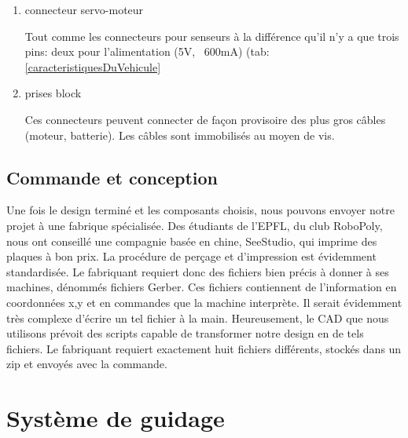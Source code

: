 \documentclass[a4paper,11pt]{report}
\begin{document}
{\begin{enumerate}
\item connecteur servo-moteur

Tout comme les connecteurs pour senseurs à la différence qu'il n'y a que trois pins: deux pour l'alimentation (5V, ~600mA) (tab: \ref{caracteristiquesDuVehicule}

\item prises block

Ces connecteurs peuvent connecter de façon provisoire des plus gros câbles (moteur, batterie). Les câbles sont immobilisés au moyen de vis.

\end{enumerate}
\subsection{Commande et conception}
Une fois le design terminé et les composants choisis, nous pouvons envoyer
notre projet à une fabrique spécialisée. Des étudiants de l'EPFL, du club
RoboPoly, nous ont conseillé une compagnie basée en chine, SeeStudio, qui imprime des
plaques à bon prix. La procédure de perçage et d'impression est évidemment
standardisée. Le fabriquant requiert donc des fichiers bien précis à donner à
ses machines, dénommés fichiers Gerber. Ces fichiers contiennent de
l'information en coordonnées x,y et en commandes que la machine interprète. Il
serait évidemment très complexe d'écrire un tel fichier à la
main. Heureusement, le CAD que nous utilisons prévoit des scripts capable de
transformer notre design en de tels fichiers. Le fabriquant requiert
exactement huit fichiers différents, stockés dans un zip et envoyés avec la commande.  


\section{Système de guidage}


}
\end{document}
